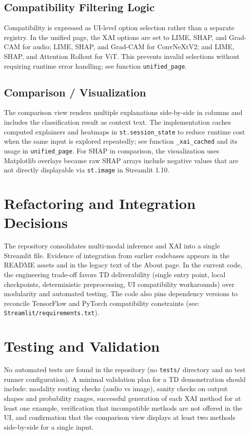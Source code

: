 \documentclass[11pt,a4paper]{article}
\begin{document}
\subsection{Compatibility Filtering Logic}
Compatibility is expressed as UI-level option selection rather than a separate registry. In the unified page, the XAI options are set to LIME, SHAP, and Grad-CAM for audio; LIME, SHAP, and Grad-CAM for ConvNeXtV2; and LIME, SHAP, and Attention Rollout for ViT. This prevents invalid selections without requiring runtime error handling; see function \texttt{unified\_page}.

\subsection{Comparison / Visualization}
The comparison view renders multiple explanations side-by-side in columns and includes the classification result as context text. The implementation caches computed explainers and heatmaps in \texttt{st.session\_state} to reduce runtime cost when the same input is explored repeatedly; see function \texttt{\_xai\_cached} and its usage in \texttt{unified\_page}. For SHAP in comparison, the visualization uses Matplotlib overlays because raw SHAP arrays include negative values that are not directly displayable via \texttt{st.image} in Streamlit 1.10.

\section{Refactoring and Integration Decisions}
The repository consolidates multi-modal inference and XAI into a single Streamlit file. Evidence of integration from earlier codebases appears in the README assets and in the legacy text of the About page. In the current code, the engineering trade-off favors TD deliverability (single entry point, local checkpoints, deterministic preprocessing, UI compatibility workarounds) over modularity and automated testing. The code also pins dependency versions to reconcile TensorFlow and PyTorch compatibility constraints (see: \texttt{Streamlit/requirements.txt}).

\section{Testing and Validation}
No automated tests are found in the repository (no \texttt{tests/} directory and no test runner configuration). A minimal validation plan for a TD demonstration should include: modality routing checks (audio vs image), sanity checks on output shapes and probability ranges, successful generation of each XAI method for at least one example, verification that incompatible methods are not offered in the UI, and confirmation that the comparison view displays at least two methods side-by-side for a single input.
\end{document}
